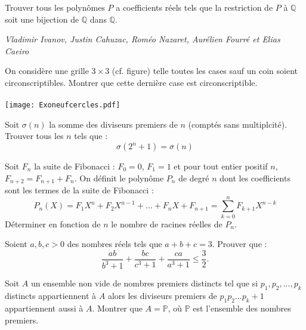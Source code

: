 \begin{exo}{}
Trouver tous les polynômes $P$ a coefficients réels tels que la restriction de $P$ à $\mathbb{Q}$ soit une bijection de $\mathbb{Q}$ dans $\mathbb{Q}$.

\medskip
\textit{Vladimir Ivanov, Justin Cahuzac, Roméo Nazaret, Aurélien Fourré et Elias Caeiro}

\end{exo}

\begin{exo}{}
On considère une grille $3\times 3$ (cf. figure) telle toutes les cases sauf un coin soient circonscriptibles. Montrer que cette dernière case est circonscriptible. \\~~\\
\texttt{[image: Exoneufcercles.pdf]}
\end{exo}


\begin{exo}{}
Soit $\sigma(n)$ la somme des diviseurs premiers de $n$ (comptés sans multiplcité). Trouver tous les $n$ tels que :
$$\sigma(2^n+1)=\sigma(n)$$
\end{exo}

\begin{exo}{}
Soit $F_n$ la suite de Fibonacci : $F_0=0$, $F_1=1$ et pour tout entier positif $n$, $F_{n+2}=F_{n+1}+F_n$.
On définit le polynôme $P_n$ de degré $n$ dont les coefficients sont les termes de la suite de Fibonacci :
$$P_n(X)= F_1X^n+F_2X^{n-1}+\ldots +F_nX+F_{n+1}=\sum_{k=0}^{n} F_{k+1}X^{n-k}$$
Déterminer en fonction de $n$ le nombre de racines réelles de $P_n$.
\end{exo}



\begin{exo}{}
Soient $a,b,c>0$ des nombres réels tels que $a+b+c=3$. Prouver que :
$$ \frac{ab}{b^{3}+1}+\frac{bc}{c^{3}+1}+\frac{ca}{a^{3}+1}\le\frac{3}{2}.$$
\end{exo}


\begin{exo}{}
Soit $A$ un ensemble non vide de nombres premiers distincts tel que si $p_1,p_2,...,p_k$ distincts appartiennent à $A$ alors les diviseurs premiers de $p_1p_2...p_k+1$ appartiennent aussi à $A$. Montrer que $A=\mathbb{P}$, où $\mathbb{P}$  est l'ensemble des nombres premiers.
\end{exo}

